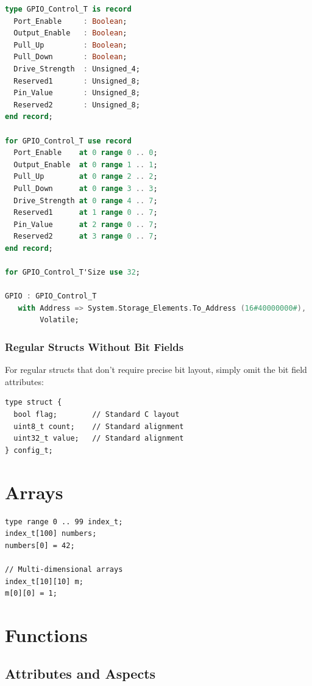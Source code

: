 \documentclass[11pt,letterpaper,twoside,openany]{book}
\begin{document}
\begin{lstlisting}[language=Ada]
type GPIO_Control_T is record
  Port_Enable     : Boolean;
  Output_Enable   : Boolean;
  Pull_Up         : Boolean;
  Pull_Down       : Boolean;
  Drive_Strength  : Unsigned_4;
  Reserved1       : Unsigned_8;
  Pin_Value       : Unsigned_8;
  Reserved2       : Unsigned_8;
end record;

for GPIO_Control_T use record
  Port_Enable    at 0 range 0 .. 0;
  Output_Enable  at 0 range 1 .. 1;
  Pull_Up        at 0 range 2 .. 2;
  Pull_Down      at 0 range 3 .. 3;
  Drive_Strength at 0 range 4 .. 7;
  Reserved1      at 1 range 0 .. 7;
  Pin_Value      at 2 range 0 .. 7;
  Reserved2      at 3 range 0 .. 7;
end record;

for GPIO_Control_T'Size use 32;

GPIO : GPIO_Control_T
   with Address => System.Storage_Elements.To_Address (16#40000000#),
        Volatile;
\end{lstlisting}

\subsubsection{Regular Structs Without Bit Fields}

For regular structs that don't require precise bit layout, simply omit the bit field attributes:

\begin{lstlisting}
type struct {
  bool flag;        // Standard C layout
  uint8_t count;    // Standard alignment
  uint32_t value;   // Standard alignment
} config_t;
\end{lstlisting}

\section{Arrays}
\begin{lstlisting}
type range 0 .. 99 index_t;
index_t[100] numbers;
numbers[0] = 42;

// Multi-dimensional arrays
index_t[10][10] m;
m[0][0] = 1;
\end{lstlisting}

\section{Functions}

\subsection{Attributes and Aspects}
\end{document}
